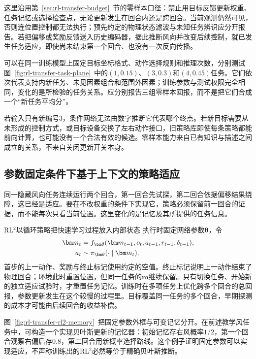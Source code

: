 这里沿用第~\ref{sec:rl-transfer-budget}~节的零样本口径：禁止用目标反馈更新权重、任务记忆或选择检查点，无论更新发生在回合内还是跨回合。当前观测仍然可见，否则连位置控制都无法执行；预先约定的物理状态滤波与未知任务辨识应分开报告。若把偏移或奖励反馈送入历史编码器，据此推断风向并改变后续控制，就已发生任务适应，即使尚未结束第一个回合、也没有一次反向传播。

可以在同一训练模型上固定目标坐标格式、动作选择规则和推理次数，分别测试图~\ref{fig:rl-transfer-task-plane}~中的$(1,0.15)$、$(3,0.3)$和$(4,0.45)$任务。它们依次代表支持内新任务、未见因素组合和范围外因素；训练参数与测试权限完全相同，变化的是所检验的任务关系。应分别报告三组零样本回报，而不是把它们合成一个“新任务平均分”。

若输入只有新编号3，条件网络无法由数字推断它代表哪个终点。若新目标需要从未形成的控制方式，或目标设备交换了左右动作接口，旧策略库即使每条策略都能前向计算，也可能没有一个合法有效的候选。零样本能力来自已有知识与描述之间成立的关系，不来自关闭更新开关本身。

\subsection{参数固定条件下基于上下文的策略适应}
\label{sec:rl-transfer-context-adaptation}

同一隐藏风向任务连续运行两个回合，第一回合先试探，第二回合依据偏移结果绕障，这已经是适应。要在不改权重的条件下实现它，策略必须保留前一回合的证据，而不能每次只看当前位置。这里变化的是记忆及其所提供的任务信息。

RL$^2$以循环策略把快速学习过程放入内部状态
执行时固定网络参数$\bm\theta$，令
\begin{align}
 \bm m_t
 &=f_{\bm\theta}(\bm m_{t-1},o_t,a_{t-1},r_{t-1},\delta_{t-1}),\notag\\
 a_t&\sim\pi_{\bm\theta}(\cdot\mid\bm m_t).
 \label{eq:rl-transfer-rl2}
\end{align}
首步的上一动作、奖励与终止标记使用约定的空值。终止标记说明上一动作结束了物理回合；环境此时重置位置，但同一任务的$\bm m$继续保留。只有切换任务、开始新的独立适应试验时，才重置任务记忆。训练时在多项任务上优化跨多个回合的总回报，参数更新发生在这个较慢的过程里。目标覆盖同一任务的多个回合，早期探测的成本才可能由后续回合的收益补偿。

图~\ref{fig:rl-transfer-rl2-memory}~把固定参数外框与可变记忆分开。在前述教学风任务中，可构造一个实现贝叶斯更新的记忆器：初始记忆存右风概率$1/2$，第一个回合观察右偏后存$0.8$，第二回合用新概率选择路线。这个例子证明固定参数可以实现适应，不声称训练出的RL$^2$必然等价于精确贝叶斯推断。

